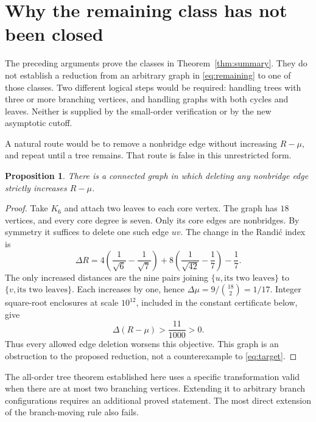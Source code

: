 \documentclass[11pt,a4paper]{article}
\newtheorem{proposition}[theorem]{Proposition}
\theoremstyle{remark}\newtheorem{remark}[theorem]{Remark}
\begin{document}
\section{Why the remaining class has not been closed}
\label{sec:remaining}

The preceding arguments prove the classes in Theorem~\ref{thm:summary}.
They do not establish a reduction from an arbitrary graph in
\eqref{eq:remaining} to one of those classes. Two different logical steps
would be required: handling trees with three or more branching vertices,
and handling graphs with both cycles and leaves. Neither is supplied by
the small-order verification or by the new asymptotic cutoff.

A natural route would be to remove a nonbridge edge without increasing
$R-\mu$, and repeat until a tree remains. That route is false in this
unrestricted form.

\begin{proposition}\label{prop:deletion-obstruction}
There is a connected graph in which deleting any nonbridge edge strictly
increases $R-\mu$.
\end{proposition}
\begin{proof}
Take $K_6$ and attach two leaves to each core vertex. The graph has
$18$ vertices, and every core degree is seven. Only its core edges are
nonbridges. By symmetry it suffices to delete one such edge $uv$.
The change in the Randi\'c index is
\[
 \Delta R=
 4\left(\frac1{\sqrt6}-\frac1{\sqrt7}\right)
 +8\left(\frac1{\sqrt{42}}-\frac17\right)-\frac17.
\]
The only increased distances are the nine pairs joining
$\{u,\text{its two leaves}\}$ to
$\{v,\text{its two leaves}\}$. Each increases by one, hence
$\Delta\mu=9/\binom{18}{2}=1/17$.
Integer square-root enclosures at scale $10^{12}$, included in the
constant certificate below, give
\[
 \Delta(R-\mu)>\frac{11}{1000}>0.
\]
Thus every allowed edge deletion worsens this objective.
This graph is an obstruction to the proposed reduction, not a
counterexample to \eqref{eq:target}.
\end{proof}

The all-order tree theorem established here uses a specific transformation
valid when there are at most two branching vertices. Extending it to
arbitrary branch configurations requires an additional proved statement.
The most direct extension of the branch-moving rule also fails.
\end{document}
